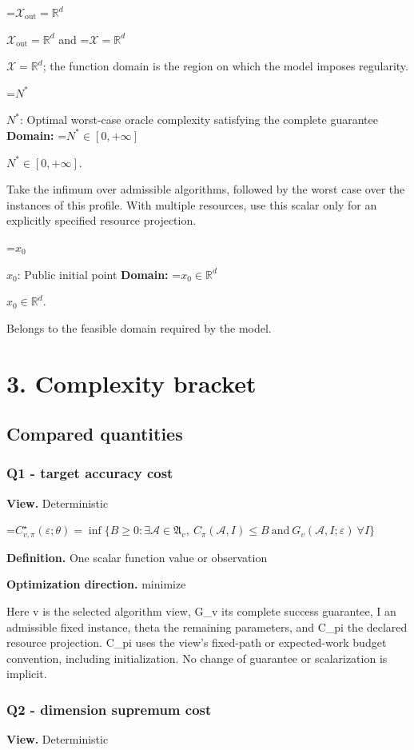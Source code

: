 \documentclass[10pt,a4paper]{article}
\newcommand{\AtlasMath}[1]{\par\begingroup\centering\setbox0=\hbox{$\displaystyle #1$}\ifdim\wd0>1.4\linewidth\typeout{ATLAS WIDE FORMULA: \the\wd0}\fi\ifdim\wd0>\linewidth\resizebox{\linewidth}{!}{\box0}\else\box0\fi\par\endgroup}
\newcommand{\AtlasInlineMath}[1]{\begingroup\setbox0=\hbox{$#1$}\ifdim\wd0>.4\linewidth\endgroup\AtlasMath{#1}\else\endgroup$#1$\fi}
\begin{document}
\AtlasInlineMath{\mathcal{X}_{\mathrm{out}}=\mathbb{R}^d} and \AtlasInlineMath{\mathcal{X}=\mathbb{R}^d}; the function domain is the region on which the model imposes regularity.

\AtlasInlineMath{N^*}: Optimal worst-case oracle complexity satisfying the complete guarantee \textbf{Domain:} \AtlasInlineMath{N^*\in[0,+\infty]}.

Take the infimum over admissible algorithms, followed by the worst case over the instances of this profile. With multiple resources, use this scalar only for an explicitly specified resource projection.

\AtlasInlineMath{x_0}: Public initial point \textbf{Domain:} \AtlasInlineMath{x_0\in\mathbb{R}^d}.

Belongs to the feasible domain required by the model.

\section{3. Complexity bracket}
\subsection{Compared quantities}
\subsubsection{Q1 - target accuracy cost}
\textbf{View.} Deterministic

\AtlasMath{C^\star_{v,\pi}(\varepsilon;\theta)=\inf\{B\ge0:\exists\mathcal A\in\mathfrak A_v,\ C_\pi(\mathcal A,I)\le B\ \text{and}\ G_v(\mathcal A,I;\varepsilon)\ \forall I\}}
\textbf{Definition.} One scalar function value or observation

\textbf{Optimization direction.} minimize

Here v is the selected algorithm view, G\_v its complete success guarantee, I an admissible fixed instance, theta the remaining parameters, and C\_pi the declared resource projection. C\_pi uses the view's fixed-path or expected-work budget convention, including initialization. No change of guarantee or scalarization is implicit.

\subsubsection{Q2 - dimension supremum cost}
\textbf{View.} Deterministic
\end{document}
